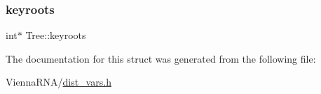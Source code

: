 \subsubsection{\texorpdfstring{keyroots}{keyroots}}
{\footnotesize\ttfamily int$\ast$ Tree\+::keyroots}



The documentation for this struct was generated from the following file\+:\begin{DoxyCompactItemize}
\item 
Vienna\+R\+N\+A/\mbox{\hyperlink{dist__vars_8h}{dist\+\_\+vars.\+h}}\end{DoxyCompactItemize}
